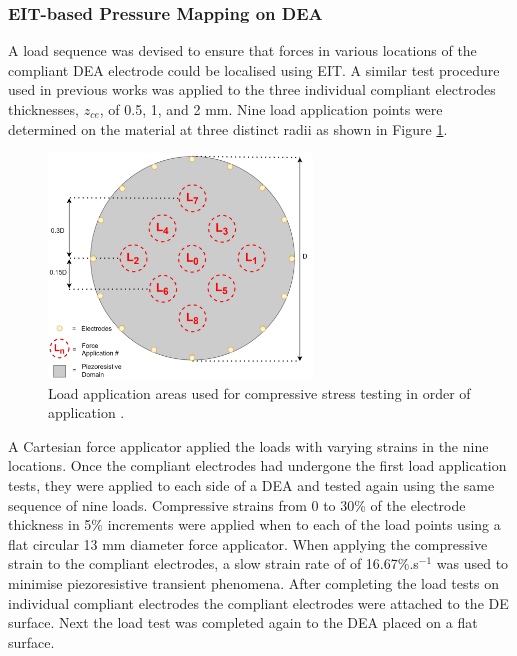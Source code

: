 \subsubsection{EIT-based Pressure Mapping on DEA}
\label{subsubsec:eit_test}
A load sequence was devised to ensure that forces in various locations of the compliant DEA electrode could be localised using EIT. A similar test procedure used in previous works\cite{Ellingham2024, Ellingham2024a} was applied to the three individual compliant electrodes thicknesses, $z_{ce}$, of 0.5, 1, and 2 mm. Nine load application points were determined on the material at three distinct radii as shown in Figure \ref{fig:force_app_map}.
\begin{figure}[H]
	\centering
	\includegraphics[width=7cm]{Figures/EIT_force_app_points_v3.11.jpg}
	\vspace{0.2cm}
	\caption{Load application areas used for compressive stress testing in order of application\cite{Ellingham2024} .}
	\label{fig:force_app_map}
\end{figure}
A Cartesian force applicator applied the loads with varying strains in the nine locations. Once the compliant electrodes had undergone the first load application tests, they were applied to each side of a DEA and tested again using the same sequence of nine loads. Compressive strains from 0 to 30\% of the electrode thickness in 5\% increments were applied when to each of the load points using a flat circular 13 mm diameter force applicator. When applying the compressive strain to the compliant electrodes, a slow strain rate of of 16.67\%.s$^{-1}$ was used to minimise piezoresistive transient phenomena. After completing the load tests on individual compliant electrodes the compliant electrodes were attached to the DE surface. Next the load test was completed again to the DEA placed on a flat surface.
